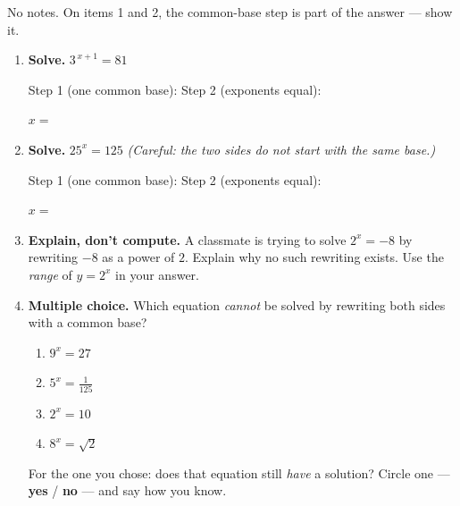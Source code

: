 \documentclass[10pt]{article}
\begin{document}
\namedateperiod

\vspace{0.08in}

No notes. On items 1 and 2, the common-base step is part of the answer --- show it.

\begin{enumerate}[leftmargin=1.8em, itemsep=12pt]
  \item \textbf{Solve.} \quad $3^{\,x+1}=81$

        \vspace{4pt}
        Step 1 (one common base): \blank{4.5cm} \quad Step 2 (exponents equal): \blank{3.4cm}

        \vspace{5pt}
        \hfill $x=$ \blank{2.2cm}

  \item \textbf{Solve.} \quad $25^{x}=125$ \quad \emph{(Careful: the two sides do not start with the
        same base.)}

        \vspace{4pt}
        Step 1 (one common base): \blank{4.5cm} \quad Step 2 (exponents equal): \blank{3.4cm}

        \vspace{5pt}
        \hfill $x=$ \blank{2.2cm}

  \item \textbf{Explain, don't compute.} A classmate is trying to solve $2^{x}=-8$ by rewriting $-8$
        as a power of $2$. Explain why no such rewriting exists. Use the \emph{range} of $y=2^{x}$ in
        your answer.

        \vspace{2pt}

  \item \textbf{Multiple choice.} Which equation \emph{cannot} be solved by rewriting both sides with
        a common base?
        \begin{enumerate}[label=\Alph*., leftmargin=1.9em, itemsep=1pt]
          \item $9^{x}=27$
          \item $5^{x}=\frac{1}{125}$
          \item $2^{x}=10$
          \item $8^{x}=\sqrt{2}$
        \end{enumerate}

        \vspace{4pt}
        For the one you chose: does that equation still \emph{have} a solution? Circle one ---
        \textbf{yes} \; / \; \textbf{no} --- and say how you know.

        \vspace{2pt}
        \writeline
\end{enumerate}
\end{document}

